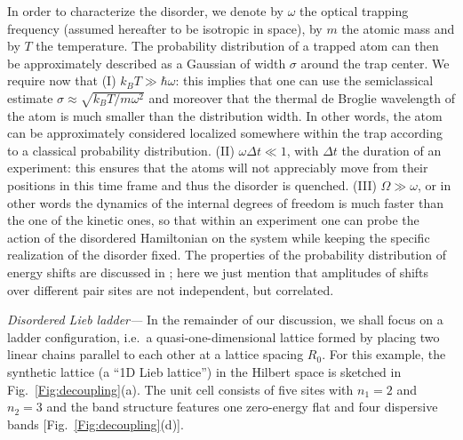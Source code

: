\documentclass[prl,aps,twocolumn,showpacs,superscriptaddress,longbibliography]{revtex4-1}
\begin{document}
In order to characterize the disorder, we denote by $\omega$ the optical trapping frequency (assumed hereafter to be isotropic in space), by $m$ the atomic mass and by $T$ the temperature. The probability distribution of a trapped atom can then be approximately described as a Gaussian of width $\sigma$ around the trap center. We require now that (I) $k_B T \gg \hbar \omega$: this implies that one can use the semiclassical estimate $\sigma \approx \sqrt{k_B T / m\omega^2}$ and moreover that the thermal de Broglie wavelength of the atom is much smaller than the distribution width. In other words, the atom can be approximately considered localized somewhere within the trap according to a classical probability distribution. (II) $\omega \Delta t \ll 1$, with $\Delta t$ the duration of an experiment: this ensures that the atoms will not appreciably move from their positions in this time frame and thus the disorder is quenched. (III) $\Omega \gg \omega$, or in other words the dynamics of the internal degrees of freedom is much faster than the one of the kinetic ones, so that within an experiment one can probe the action of the disordered Hamiltonian on the system while keeping the specific realization of the disorder fixed. The properties of the probability distribution of energy shifts are discussed in \cite{SM}; here we just mention that amplitudes of shifts over different pair sites are not independent, but correlated.

\emph{Disordered Lieb ladder---} In the remainder of our discussion, we shall focus on a ladder configuration, i.e.~a quasi-one-dimensional lattice formed by placing two linear chains parallel to each other at a lattice spacing $R_0$. For this example, the synthetic lattice (a ``1D Lieb lattice'') in the Hilbert space is sketched in Fig.~\ref{Fig:decoupling}(a). The unit cell consists of five sites with $n_1 = 2$ and $n_2 = 3$ and the band structure features one zero-energy flat and four dispersive bands [Fig.~\ref{Fig:decoupling}(d)].
\end{document}
